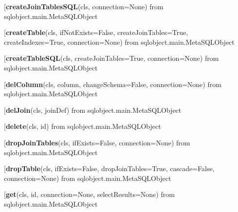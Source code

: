\begin{description}\item[{\bf createJoinTablesSQL}(cls, connection=None) from sqlobject.main.MetaSQLObject\end{description}

\begin{description}\item[{\bf createTable}(cls, ifNotExists=False, createJoinTables=True, createIndexes=True, connection=None) from sqlobject.main.MetaSQLObject\end{description}

\begin{description}\item[{\bf createTableSQL}(cls, createJoinTables=True, connection=None) from sqlobject.main.MetaSQLObject\end{description}

\begin{description}\item[{\bf delColumn}(cls, column, changeSchema=False, connection=None) from sqlobject.main.MetaSQLObject\end{description}

\begin{description}\item[{\bf delJoin}(cls, joinDef) from sqlobject.main.MetaSQLObject\end{description}

\begin{description}\item[{\bf delete}(cls, id) from sqlobject.main.MetaSQLObject\end{description}

\begin{description}\item[{\bf dropJoinTables}(cls, ifExists=False, connection=None) from sqlobject.main.MetaSQLObject\end{description}

\begin{description}\item[{\bf dropTable}(cls, ifExists=False, dropJoinTables=True, cascade=False, connection=None) from sqlobject.main.MetaSQLObject\end{description}

\begin{description}\item[{\bf get}(cls, id, connection=None, selectResults=None) from sqlobject.main.MetaSQLObject\end{description}


